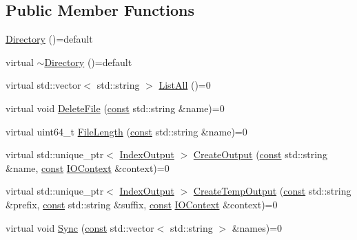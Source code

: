 \subsection*{Public Member Functions}
\begin{DoxyCompactItemize}
\item 
\mbox{\hyperlink{classlucene_1_1core_1_1store_1_1Directory_adbf58dbaee741cd16461621cfef867f9}{Directory}} ()=default
\item 
virtual \mbox{\hyperlink{classlucene_1_1core_1_1store_1_1Directory_a564ffbe5f61ca629f4a0ca8b4cd963fd}{$\sim$\+Directory}} ()=default
\item 
virtual std\+::vector$<$ std\+::string $>$ \mbox{\hyperlink{classlucene_1_1core_1_1store_1_1Directory_ac89cd351d7dc2a1e16763ae2a1984518}{List\+All}} ()=0
\item 
virtual void \mbox{\hyperlink{classlucene_1_1core_1_1store_1_1Directory_ae7e4ec460d8646abb925fa9d31a6f354}{Delete\+File}} (\mbox{\hyperlink{ZlibCrc32_8h_a2c212835823e3c54a8ab6d95c652660e}{const}} std\+::string \&name)=0
\item 
virtual uint64\+\_\+t \mbox{\hyperlink{classlucene_1_1core_1_1store_1_1Directory_a8a3db6f51db917f0cbec6e28ac9c685e}{File\+Length}} (\mbox{\hyperlink{ZlibCrc32_8h_a2c212835823e3c54a8ab6d95c652660e}{const}} std\+::string \&name)=0
\item 
virtual std\+::unique\+\_\+ptr$<$ \mbox{\hyperlink{classlucene_1_1core_1_1store_1_1IndexOutput}{Index\+Output}} $>$ \mbox{\hyperlink{classlucene_1_1core_1_1store_1_1Directory_aae10f6510f3bfb7e561fc438d4419e4a}{Create\+Output}} (\mbox{\hyperlink{ZlibCrc32_8h_a2c212835823e3c54a8ab6d95c652660e}{const}} std\+::string \&name, \mbox{\hyperlink{ZlibCrc32_8h_a2c212835823e3c54a8ab6d95c652660e}{const}} \mbox{\hyperlink{classlucene_1_1core_1_1store_1_1IOContext}{I\+O\+Context}} \&context)=0
\item 
virtual std\+::unique\+\_\+ptr$<$ \mbox{\hyperlink{classlucene_1_1core_1_1store_1_1IndexOutput}{Index\+Output}} $>$ \mbox{\hyperlink{classlucene_1_1core_1_1store_1_1Directory_a1854df49ef06b705ae603f9430584106}{Create\+Temp\+Output}} (\mbox{\hyperlink{ZlibCrc32_8h_a2c212835823e3c54a8ab6d95c652660e}{const}} std\+::string \&prefix, \mbox{\hyperlink{ZlibCrc32_8h_a2c212835823e3c54a8ab6d95c652660e}{const}} std\+::string \&suffix, \mbox{\hyperlink{ZlibCrc32_8h_a2c212835823e3c54a8ab6d95c652660e}{const}} \mbox{\hyperlink{classlucene_1_1core_1_1store_1_1IOContext}{I\+O\+Context}} \&context)=0
\item 
virtual void \mbox{\hyperlink{classlucene_1_1core_1_1store_1_1Directory_a9bf7aa728353d62ada6d7d0b431b12a0}{Sync}} (\mbox{\hyperlink{ZlibCrc32_8h_a2c212835823e3c54a8ab6d95c652660e}{const}} std\+::vector$<$ std\+::string $>$ \&names)=0

\end{DoxyCompactItemize}
